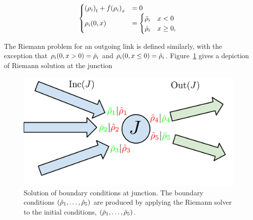 \begin{equation}
	\begin{cases}
		\left(\cvar_{\link}\right)_{t}+f\left(\cvar_{\link}\right)_{x} & =0             \\
		\cvar_{\link}\left(0,x\right)                                  & =\begin{cases} 
		\initstate_{\link}                                             & x<0            \\
		\trace{\cvar}_{\link}                                          & x\ge0,         
	\end{cases}
	\end{cases}\label{eq:riemann-problem}
\end{equation}

The Riemann problem for an outgoing link is defined similarly, with
the exception that $\cvar_{\link}\left(0,x>0\right)=\initstate_{\link}$
and $\cvar_{\link}\left(0,x\le0\right)=\trace{\cvar}_{\link}$. Figure~\ref{fig:Solution-of-boundary}
gives a depiction of Riemann solution at the junction%
\begin{figure}
	\begin{centering}
		\includegraphics[width=0.5\columnwidth]{presentation/figs-gen/junctions-riemann-rs} 
		\par\end{centering}
		
		\caption{Solution of boundary conditions at junction. The boundary conditions
			$\tuple{\trace{\cvar}_{1}}{\trace{\cvar}_{5}}$ are produced by applying
			the Riemann solver to the initial conditions, $\tuple{\initstate_{1}}{\initstate_{5}}$.\label{fig:Solution-of-boundary}}
		\end{figure}
		
